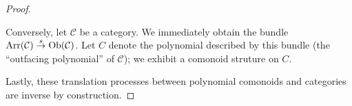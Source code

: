 \documentclass{amsart}
\begin{document}
\begin{proof}
\begin{center}
  \end{center}

  Conversely, let $\mathcal{C}$ be a category. We immediately obtain the
  bundle ${\operatorname{Arr}(\mathcal{C})\overset{s}{\to}\operatorname{Ob}(\mathcal{C})}$. Let $C$ denote
  the polynomial described by this bundle (the ``outfacing polynomial''
  of $\mathcal{C}$); we exhibit a comonoid struture on $C$.

  Lastly, these translation processes between polynomial comonoids
  and categories are inverse by construction.
\end{proof}
\end{document}
